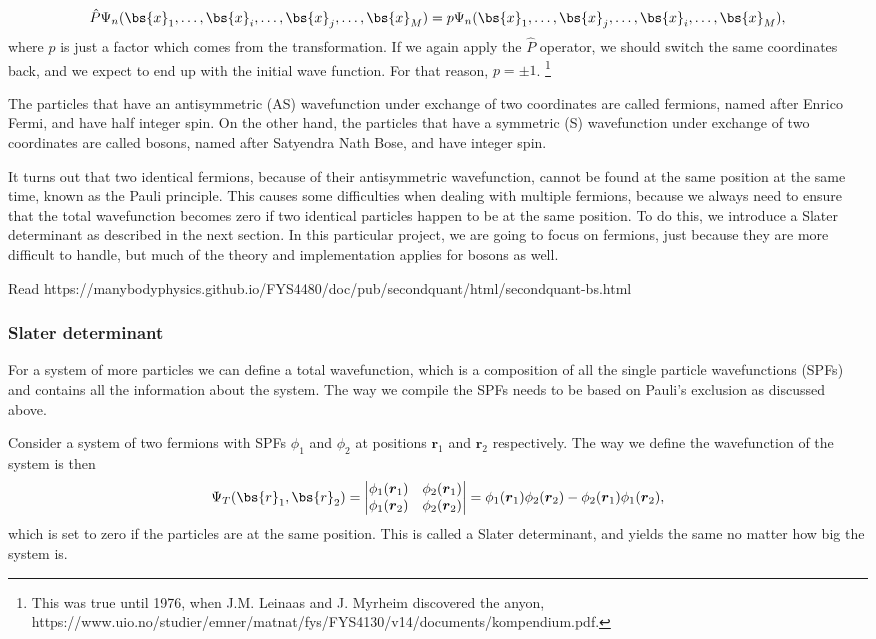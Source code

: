 \begin{equation}
\hat{P}\Psi_n(\bs{x}_1,\hdots,\bs{x}_i,\hdots,\bs{x}_j,\hdots,\bs{x}_M)=p\Psi_n(\bs{x}_1,\hdots,\bs{x}_j,\hdots,\bs{x}_i,\hdots,\bs{x}_M),
\end{equation}
where $p$ is just a factor which comes from the transformation. If we again apply the $\hat{P}$ operator, we should switch the same coordinates back, and we expect to end up with the initial wave function. For that reason, $p=\pm1$. \footnote{This was true until 1976, when J.M. Leinaas and J. Myrheim discovered the anyon, https://www.uio.no/studier/emner/matnat/fys/FYS4130/v14/documents/kompendium.pdf.}

The particles that have an antisymmetric (AS) wavefunction under exchange of two coordinates are called fermions, named after Enrico Fermi, and have half integer spin. On the other hand, the particles that have a symmetric (S) wavefunction under exchange of two coordinates are called bosons, named after Satyendra Nath Bose, and have integer spin. 

It turns out that two identical fermions, because of their antisymmetric wavefunction, cannot be found at the same position at the same time, known as the Pauli principle. This causes some difficulties when dealing with multiple fermions, because we always need to ensure that the total wavefunction becomes zero if two identical particles happen to be at the same position. To do this, we introduce a Slater determinant as described in the next section. In this particular project, we are going to focus on fermions, just because they are more difficult to handle, but much of the theory and implementation applies for bosons as well. 

Read https://manybodyphysics.github.io/FYS4480/doc/pub/secondquant/html/secondquant-bs.html

\subsubsection{Slater determinant} \label{subsubsec:slater}
For a system of more particles we can define a total wavefunction, which is a composition of all the single particle wavefunctions (SPFs) and contains all the information about the system. The way we compile the SPFs needs to be based on Pauli's exclusion as discussed above.

Consider a system of two fermions with SPFs $\phi_1$ and $\phi_2$ at positions $\boldsymbol{r}_1$ and $\boldsymbol{r}_2$ respectively. The way we define the wavefunction of the system is then
\begin{equation}
\Psi_T(\bs{r}_1, \bs{r}_2)=
\begin{vmatrix}
\phi_1(\boldsymbol{r}_1) & \phi_2(\boldsymbol{r}_1)\\
\phi_1(\boldsymbol{r}_2) & \phi_2(\boldsymbol{r}_2)
\end{vmatrix}
=\phi_1(\boldsymbol{r}_1)\phi_2(\boldsymbol{r}_2)-\phi_2(\boldsymbol{r}_1)\phi_1(\boldsymbol{r}_2),
\end{equation}
which is set to zero if the particles are at the same position. This is called a Slater determinant, and yields the same no matter how big the system is.

